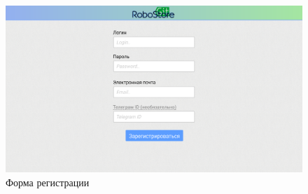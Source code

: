 \documentclass[12pt, a4paper]{article}
\begin{document}
\begin{figure}[H]
  \centering
  \includegraphics[width=17cm]{png/store_sign.png}
  \caption{Форма регистрации}
\end{figure}
\end{document}
